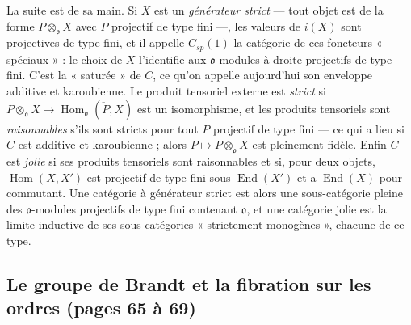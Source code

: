 \documentclass[11pt,a4paper]{article}
\begin{document}
La suite est de sa main. Si $X$ est un \emph{générateur strict} --- tout objet
est de la forme $P \otimes_{\mathfrak{o}} X$ avec $P$ projectif de type fini ---,
les valeurs de $i(X)$ sont projectives de type fini, et il appelle $C_{sp}(1)$
la catégorie de ces foncteurs « spéciaux » : le choix de $X$ l'identifie aux
$\mathfrak{o}$-modules à droite projectifs de type fini. C'est la « saturée »
de $C$, ce qu'on appelle aujourd'hui son enveloppe additive et karoubienne. Le
produit tensoriel externe est \emph{strict} si $P \otimes_{\mathfrak{o}} X \to
\operatorname{Hom}_{\mathfrak{o}}(\check{P}, X)$ est un isomorphisme, et les
produits tensoriels sont \emph{raisonnables} s'ils sont stricts pour tout $P$
projectif de type fini --- ce qui a lieu si $C$ est additive et karoubienne ;
alors $P \mapsto P \otimes_{\mathfrak{o}} X$ est pleinement fidèle. Enfin $C$
est \emph{jolie} si ses produits tensoriels sont raisonnables et si, pour deux
objets, $\operatorname{Hom}(X, X')$ est projectif de type fini sous
$\operatorname{End}(X')$ et a $\operatorname{End}(X)$ pour commutant. Une
catégorie à générateur strict est alors une sous-catégorie pleine des
$\mathfrak{o}$-modules projectifs de type fini contenant $\mathfrak{o}$, et une
catégorie jolie est la limite inductive de ses sous-catégories « strictement
monogènes », chacune de ce type.

\subsection*{Le groupe de Brandt et la fibration sur les ordres (pages 65 à 69)}
\end{document}
